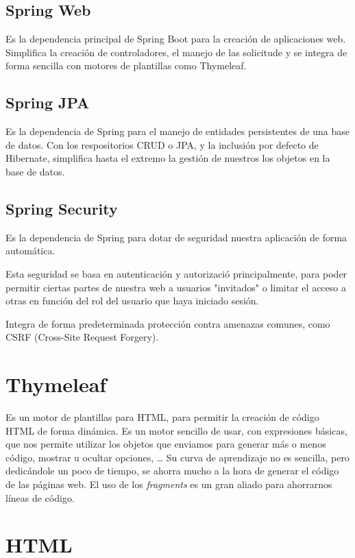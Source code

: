 \subsection{Spring Web}

Es la dependencia principal de Spring Boot para la creación de aplicaciones web. 
Simplifica la creación de controladores, el manejo de las solicitude y se integra de forma sencilla con motores de plantillas como Thymeleaf.

\subsection{Spring JPA}

Es la dependencia de Spring para el manejo de entidades persistentes de una base de datos. 
Con los respositorios CRUD o JPA, y la inclusión por defecto de Hibernate, simplifica hasta el extremo la gestión de nuestros los objetos en la base de datos.

\subsection{Spring Security}

Es la dependencia de Spring para dotar de seguridad nuestra aplicación de forma automática.

Esta seguridad se basa en autenticación y autorizació principalmente, para poder permitir ciertas partes de nuestra web a usuarios "invitados" o limitar el acceso a otras en función del rol del usuario que haya iniciado sesión.

Integra de forma predeterminada protección contra amenazas comunes, como CSRF (Cross-Site Request Forgery).

\section{Thymeleaf}

Es un motor de plantillas para HTML, para permitir la creación de código HTML de forma dinámica.
Es un motor sencillo de usar, con expresiones básicas, que nos permite utilizar los objetos que enviamos para generar más o menos código, mostrar u ocultar opciones, \dots
Su curva de aprendizaje no es sencilla, pero dedicándole un poco de tiempo, se ahorra mucho a la hora de generar el código de las páginas web.
El uso de los \textit{fragments} es un gran aliado para ahorrarnos líneas de código.

\section{HTML}


